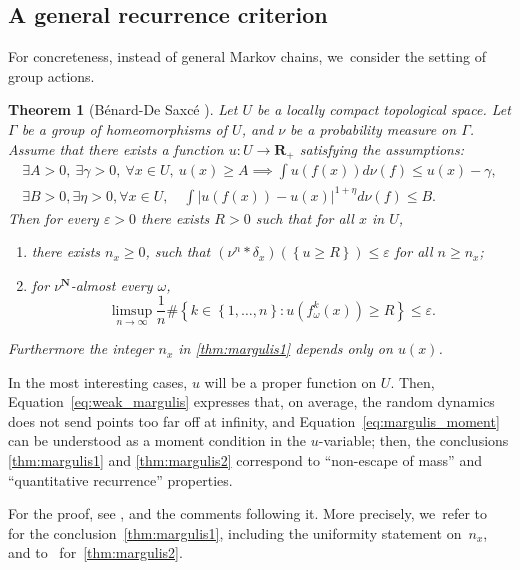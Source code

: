 \documentclass[JEP,XML,SOM,Unicode,published]{cedram}
\let\sep :
\let\e\varepsilon
\newcommand{\set}[1]{\left\{#1\right\}}
\newcommand{\abs}[1]{\left\vert#1\right\vert}
\newcommand{\unsur}[1]{\frac{1}{#1}}
\newcommand{\lrpar}[1]{\left(#1\right)}
\def\R{\mathbf{R}}
\def\N{\mathbf{N}}
\theoremstyle{plain}
\newtheorem{thm}{Theorem}[section]
\theoremstyle{definition}
\begin{document}
\subsection{A general recurrence criterion}
For concreteness, instead of general Mar\-kov chains, we~consider the setting of group actions.

\begin{thm}[Bénard-De Saxcé \cite{benard-desaxce}]\label{thm:margulis} Let $U$ be a locally compact topological space. Let $\Gamma$ be a group of homeomorphisms of $U$, and $\nu$ be a probability measure on $\Gamma$.
Assume that there exists a function $u:U\to \R_+$ satisfying the assumptions:
\begin{eqnarray}
\label{eq:weak_margulis}
\exists A>0, \ \exists \gamma>0, \ \forall x\in U, \ u(x)\geq A \implies
\int u(f(x))d\nu(f) \leq u(x) - \gamma, \\
\label{eq:margulis_moment}
\exists B>0, \exists \eta>0, \forall x\in U, \quad \int \abs{u(f(x)) - u(x) } ^{1+\eta} d\nu(f) \leq B.
\end{eqnarray}
Then for every $\e>0$ there exists $R>0$ such that for all $x$ in $U$,
\begin{enumerate}
\item\label{thm:margulis1} there exists $n_x\geq 0$, such that $(\nu^{n}\ast \delta_x )(\set{u\geq R}) \leq \e$ for all $n\geq n_x$;
\item\label{thm:margulis2} for $\nu^\N$-almost every $\omega$,
\[
\limsup_{n\to\infty} \unsur{n} \# \set{k\in \set{1, \ldots, n} \sep  u \lrpar{f^k_\omega(x) }\geq R} \leq \e.
\]
\end{enumerate}
Furthermore the integer $n_x$ in \eqref{thm:margulis1} depends only on $u(x)$.
\end{thm}

In the most interesting cases, $u$ will be a proper function on $U$. Then, Equation~\eqref{eq:weak_margulis}
expresses that, on average, the random dynamics does not send points too far off at infinity,
and Equation~\eqref{eq:margulis_moment} can be understood as a moment condition in the $u$\nobreakdash-vari\-able; then, the conclusions \eqref{thm:margulis1} and \eqref{thm:margulis2} correspond to ``non-escape of mass'' and ``quantitative recurrence'' properties.

For the proof, see \cite[Prop.\,1.2]{benard-desaxce}, and the comments following it. More
precisely, we~refer to~\cite[Prop.\,2.5]{benard-desaxce} for the conclusion~\eqref{thm:margulis1},
including the uniformity statement on~$n_x$, and to~\cite[Prop.\,2.7]{benard-desaxce} for~\eqref{thm:margulis2}.
\end{document}
